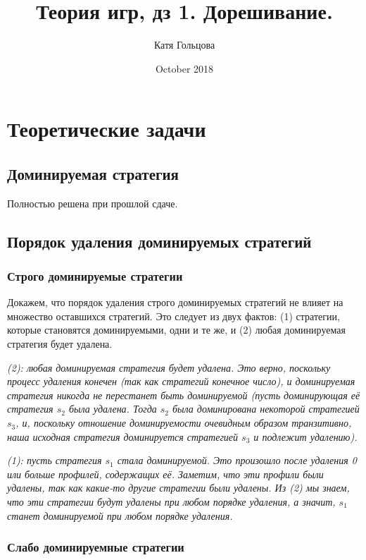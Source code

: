 \documentclass[a4paper,11pt,notitlepage]{article}
\title{Теория игр, дз 1. Дорешивание.}
\author{Катя Гольцова}
\date{October 2018}
\begin{document}
\maketitle

\section{Теоретические задачи}
\subsection{Доминируемая стратегия}

Полностью решена при прошлой сдаче.

\subsection{Порядок удаления доминируемых стратегий}
\subsubsection{Строго доминируемые стратегии}

Докажем, что порядок удаления строго доминируемых стратегий не влияет на множество оставшихся стратегий. Это следует из двух фактов: (1) стратегии, которые становятся доминируемыми, одни и те же, и (2) любая доминируемая стратегия будет удалена.

\textit{(2): любая доминируемая стратегия будет удалена. Это верно, поскольку процесс удаления конечен (так как стратегий конечное число), и доминируемая стратегия никогда не перестанет быть доминируемой (пусть доминирующая её стратегия $s_2$ была удалена. Тогда $s_2$ была доминирована некоторой стратегией $s_3$, и, поскольку отношение доминируемости очевидным образом транзитивно, наша исходная стратегия доминируется стратегией $s_3$ и подлежит удалению).}

\textit{(1): пусть стратегия $s_1$ стала доминируемой. Это произошло после удаления 0 или больше профилей, содержащих её. Заметим, что эти профили были удалены, так как какие-то другие стратегии были удалены. Из (2) мы знаем, что эти стратегии будут удалены при любом порядке удаления, а значит, $s_1$ станет доминируемой при любом порядке удаления.}

\subsubsection{Слабо доминируемные стратегии}
\end{document}
